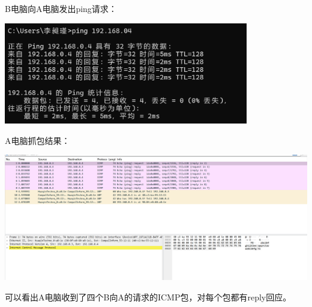 \documentclass{article}
\begin{document}
B电脑向A电脑发出ping请求：
\begin{center}
    \includegraphics[width=0.8\textwidth]{2_2_images/1.png}
\end{center}

A电脑抓包结果：
\begin{center}
    \includegraphics[width=1\textwidth]{2_2_images/3.png}
\end{center}

可以看出A电脑收到了四个B向A的请求的ICMP包，对每个包都有reply回应。
\end{document}
